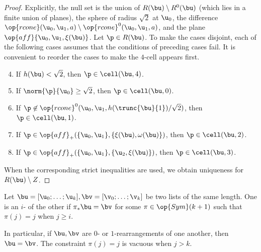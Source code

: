 \begin{proof} 
  Explicitly, the null set is the union of $R(\bu)\setminus R^0(\bu)$
  (which lies in a finite union of planes), the sphere of radius
  $\sqrt2$ at $\u_0$, the difference $\op{rcone}(\u_0,\u_1,a)\setminus
  \op{rcone}^0(\u_0,\u_1,a)$, and the plane
  $\op{aff}\{\u_0,\u_1,\xi(\bu)\}$.  Let $\p\in R(\bu)$.  To make the
  cases disjoint, each of the following cases assumes that the
  conditions of preceding cases fail.  It is convenient to reorder the
  cases to make the $4$-cell appears first.
\begin{enumerate}
\setcounter{enumi}{3}
\item %
If $h(\bu)<\sqrt2$,  then $\p\in\cell(\bu,4)$.

\setcounter{enumi}{-1}
\item %
If $\norm{\p}{\u_0} \ge\sqrt2$,  then $\p\in\cell(\bu,0)$.

\item
If $\p\not\in\op{rcone}^0(\u_0,\u_1,h(\trunc{\bu}{1})/\sqrt2)$, then
 $\p\in \cell(\bu,1)$.

\item
If $\p\in \op{aff}_+(\{\u_0,\u_1\},\{\xi(\bu),\omega(\bu)\})$, then
 $\p\in \cell(\bu,2)$.

\item If $\p\in \op{aff}_+(\{\u_0,\u_1\},\{\u_2,\xi(\bu)\})$, then
  $\p\in \cell(\bu,3)$.
\end{enumerate}
When the corresponding strict inequalities are used, we obtain
uniqueness for $R(\bu)\setminus Z$.
\end{proof}



\begin{definition}[$i$-rearrangement] 
   Let
  $\bu=[\u_0;\ldots;\u_k],\bv=[\v_0;\ldots;\v_k]$ be two lists of the
  same length.  One is an $i$- of the other if
  $\pi_*\bu = \bv$ for some $\pi\in\op{Sym}(k+1)$ such that $\pi(j) =
  j$ when $j \ge i$.
\end{definition}

In particular, if $\bu,\bv$ are $0$- or $1$-rearrangements of one
another, then $\bu = \bv$.  The constraint $\pi(j)=j$ is vacuous when
$j>k$.



